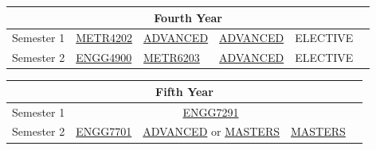 \begin{table}[H]
    \centering
    \begin{tabular}{| m{6em} | m{5em} m{5em} m{5em} m{5em} m{5em} |}
        \hline
        \multicolumn{6}{|c|}{\bfseries Fourth Year} \\
        \hline
        Semester 1 & \hyperlink{METR4202}{METR4202} & \hyperlink{ADVANCED}{ADVANCED} & \hyperlink{ADVANCED}{ADVANCED} & ELECTIVE & \\
        Semester 2 & \hyperlink{ENGG4900}{ENGG4900} & \hyperlink{METR6203}{METR6203} & \hyperlink{ADVANCED}{ADVANCED} & ELECTIVE & \\
        \hline
    \end{tabular}
\end{table}
\begin{table}[H]
    \centering
    \begin{tabular}{| m{6em} | m{5em} m{5em} m{5em} m{5em} m{5em} |}
        \hline
        \multicolumn{6}{|c|}{\bfseries Fifth Year} \\
        \hline
        Semester 1 & \multicolumn{4}{c}{\hyperlink{ENGG7291}{ENGG7291}} & \\
        Semester 2 & \hyperlink{ENGG7701}{ENGG7701} & \multicolumn{2}{c}{\hyperlink{ADVANCED}{ADVANCED} or \hyperlink{MASTERS}{MASTERS}} & \hyperlink{MASTERS}{MASTERS} & \\
        \hline
    \end{tabular}
\end{table}
\renewcommand{\arraystretch}{1}
\newpage

